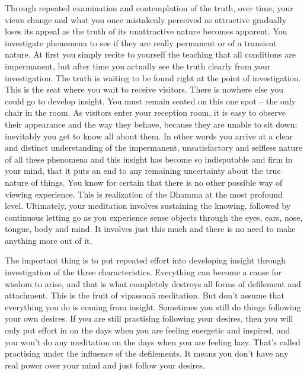 Through repeated examination and contemplation of the truth, over time, your views change and what you once mistakenly perceived as attractive gradually loses its appeal as the truth of its unattractive nature becomes apparent. You investigate phenomena to see if they are really permanent or of a transient nature. At first you simply recite to yourself the teaching that all conditions are impermanent, but after time you actually see the truth clearly from your investigation. The truth is waiting to be found right at the point of investigation. This is the seat where you wait to receive visitors. There is nowhere else you could go to develop insight. You must remain seated on this one spot -- the only chair in the room. As visitors enter your reception room, it is easy to observe their appearance and the way they behave, because they are unable to sit down; inevitably you get to know all about them. In other words you arrive at a clear and distinct understanding of the impermanent, unsatisfactory and selfless nature of all these phenomena and this insight has become so indisputable and firm in your mind, that it puts an end to any remaining uncertainty about the true nature of things. You know for certain that there is no other possible way of viewing experience. This is realization of the Dhamma at the most profound level. Ultimately, your meditation involves sustaining the knowing, followed by continuous letting go as you experience sense objects through the eyes, ears, nose, tongue, body and mind. It involves just this much and there is no need to make anything more out of it. 

The important thing is to put repeated effort into developing insight through investigation of the three characteristics. Everything can become a cause for wisdom to arise, and that is what completely destroys all forms of defilement and attachment. This is the fruit of vipassan\=a meditation. But don't assume that everything you do is coming from insight. Sometimes you still do things following your own desires. If you are still practising following your desires, then you will only put effort in on the days when you are feeling energetic and inspired, and you won't do any meditation on the days when you are feeling lazy. That's called practising under the influence of the defilements. It means you don't have any real power over your mind and just follow your desires. 


